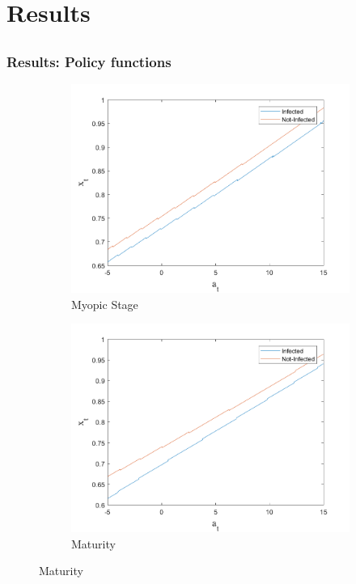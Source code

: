 \documentclass{beamer}
\begin{document}
\section{Results}
\subsection{}
\begin{frame}

\frametitle{Results: Policy functions}

\begin{figure}
  \centering
  \caption{Extramarital risky sex consumption \underline{\textbf{educated}} sex buyers: Myopic vs Maturity}
    \begin{subfigure}[b]{0.45\textwidth} \caption{Myopic Stage}
        \centering
        \includegraphics[width=1.2\textwidth]{FIG9a.png}
      
    \end{subfigure}
    \hfill
      \begin{subfigure}[b]{0.45\textwidth}\caption{Maturity}
        \centering
        \includegraphics[width=1.2\textwidth]{FIG9.png}
       
    \end{subfigure}
    
\end{figure}
\end{frame}
\end{document}
